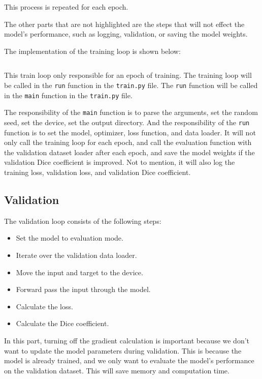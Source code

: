 This process is repeated for each epoch.

The other parts that are not highlighted are the steps that will not effect the model's performance, such as logging, validation, or saving the model weights.

The implementation of the training loop is shown below:

\inputminted[firstline=23, lastline=56, highlightlines={38,39,41,42,48-51}]{python}{../src/train.py}

This train loop only responsible for an epoch of training.
The training loop will be called in the \texttt{run} function in the \texttt{train.py} file.
The \texttt{run} function will be called in the \texttt{main} function in the \texttt{train.py} file.

The responsibility of the \texttt{main} function is to parse the arguments, set the random seed, set the device, set the output directory.
And the responsibility of the \texttt{run} function is to set the model, optimizer, loss function, and data loader.
It will not only call the training loop for each epoch, and call the evaluation function with the validation dataset loader after each epoch, and save the model weights if the validation Dice coefficient is improved.
Not to mention, it will also log the training loss, validation loss, and validation Dice coefficient.


\subsection{Validation}

The validation loop consists of the following steps:
\begin{itemize}
    \item Set the model to evaluation mode.
    \item Iterate over the validation data loader.
    \item Move the input and target to the device.
    \item Forward pass the input through the model.
    \item Calculate the loss.
    \item Calculate the Dice coefficient.
\end{itemize}

In this part, turning off the gradient calculation is important because we don't want to update the model parameters during validation.
This is because the model is already trained, and we only want to evaluate the model's performance on the validation dataset.
This will save memory and computation time.

